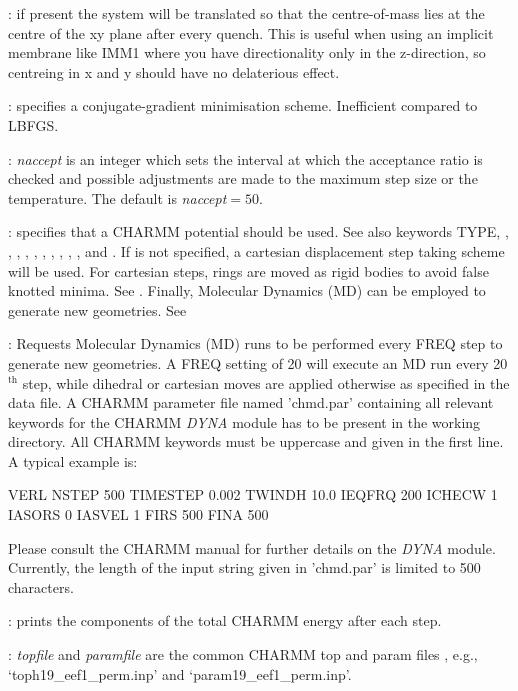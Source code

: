 : if present the system will be translated so that the centre-of-mass 
lies at the centre of the xy plane after every quench. This is useful when using an implicit membrane like IMM1 where you have directionality only in the
z-direction, so centreing in x and y should have no delaterious effect.

: specifies a conjugate-gradient minimisation scheme. Inefficient compared to LBFGS.

: {\it naccept\/} is an integer which sets the interval
at which the acceptance ratio is checked and possible adjustments are made to the maximum
step size or the temperature. The default is {\it naccept\/}$=50$.
  
: specifies that a CHARMM potential should be used.
See also keywords {TYPE}, {}, {}, {}, {},
{}, {}, {}, {}, {}, 
{}, and {}. If {} is not specified, a cartesian 
displacement step taking scheme will be used. For cartesian steps, rings are moved as rigid bodies to avoid false knotted minima. See {}. Finally, Molecular Dynamics (MD) can be employed to generate new geometries. See {} 

: Requests Molecular Dynamics (MD) runs to be performed every {FREQ} step to generate new geometries. A {FREQ} setting of 20 will execute an MD run every 20$^\mathrm{th}$ step, while dihedral or cartesian moves are applied otherwise as specified in the data file. A CHARMM parameter file named 'chmd.par' containing all relevant keywords for the CHARMM {\it DYNA} module has to be present in the working directory. All CHARMM keywords must be uppercase and given in the first line. A typical example is:

VERL NSTEP 500 TIMESTEP 0.002 TWINDH 10.0 IEQFRQ 200 ICHECW 1 IASORS 0 IASVEL 1 FIRS 500 FINA 500 

Please consult the CHARMM manual for further details on the {\it DYNA} module. Currently, the length of the input string given in 'chmd.par' is limited to 500 characters.

: prints the components of the total CHARMM energy after each step.

:  {\it topfile} and {\it paramfile} are the
common CHARMM top and param files , e.g., `toph19\_eef1\_perm.inp' and `param19\_eef1\_perm.inp'.

